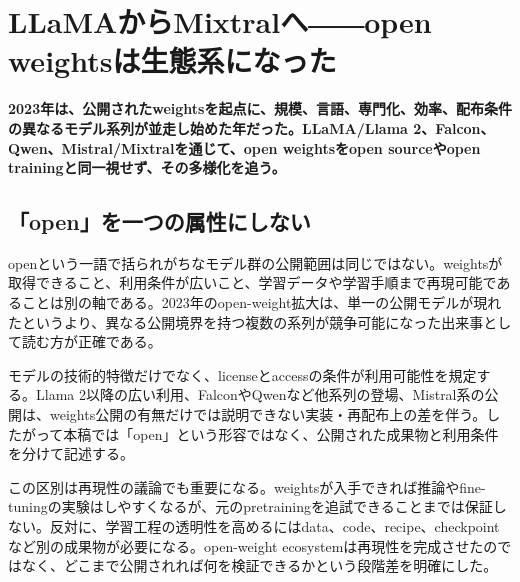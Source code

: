 \section{LLaMAからMixtralへ――open weightsは生態系になった}
\label{pkg:open-weight-ecosystem}
\noindent\textbf{2023年は、公開されたweightsを起点に、規模、言語、専門化、効率、配布条件の異なるモデル系列が並走し始めた年だった。LLaMA/Llama 2、Falcon、Qwen、Mistral/Mixtralを通じて、open weightsをopen sourceやopen trainingと同一視せず、その多様化を追う。}\autocite{src-00c370ab2324,src-1fd43f93adcc,src-240ca564b6b8,src-3db09fede330,src-5c8e2db8871a,src-74aa7e2a7ca4,src-81f670ec1e74,src-8bdb904686fb,src-9df482e2c96c,src-b7e5243e6d59,src-bc7aba201f01,src-d4b6359bbad1,src-dd2cfa98160d,src-f0349196879e}

\subsection{「open」を一つの属性にしない}

openという一語で括られがちなモデル群の公開範囲は同じではない。weightsが取得できること、利用条件が広いこと、学習データや学習手順まで再現可能であることは別の軸である。2023年のopen-weight拡大は、単一の公開モデルが現れたというより、異なる公開境界を持つ複数の系列が競争可能になった出来事として読む方が正確である。\autocite{src-00c370ab2324,src-1fd43f93adcc,src-240ca564b6b8,src-3db09fede330,src-5c8e2db8871a,src-74aa7e2a7ca4,src-81f670ec1e74,src-8bdb904686fb,src-9df482e2c96c,src-b7e5243e6d59,src-bc7aba201f01,src-d4b6359bbad1,src-dd2cfa98160d,src-f0349196879e}


モデルの技術的特徴だけでなく、licenseとaccessの条件が利用可能性を規定する。Llama 2以降の広い利用、FalconやQwenなど他系列の登場、Mistral系の公開は、weights公開の有無だけでは説明できない実装・再配布上の差を伴う。したがって本稿では「open」という形容ではなく、公開された成果物と利用条件を分けて記述する。\autocite{src-00c370ab2324,src-1fd43f93adcc,src-240ca564b6b8,src-3db09fede330,src-5c8e2db8871a,src-74aa7e2a7ca4,src-81f670ec1e74,src-8bdb904686fb,src-9df482e2c96c,src-b7e5243e6d59,src-bc7aba201f01,src-d4b6359bbad1,src-dd2cfa98160d,src-f0349196879e}


この区別は再現性の議論でも重要になる。weightsが入手できれば推論やfine-tuningの実験はしやすくなるが、元のpretrainingを追試できることまでは保証しない。反対に、学習工程の透明性を高めるにはdata、code、recipe、checkpointなど別の成果物が必要になる。open-weight ecosystemは再現性を完成させたのではなく、どこまで公開されれば何を検証できるかという段階差を明確にした。\autocite{src-240ca564b6b8,src-3db09fede330,src-5c8e2db8871a,src-8bdb904686fb,src-9df482e2c96c,src-b7e5243e6d59,src-bc7aba201f01,src-d4b6359bbad1}


